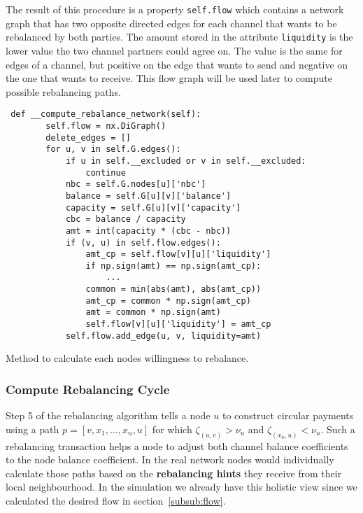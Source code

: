 \documentclass[final]{fhnwreport}       %
\begin{document}
The result of this procedure is a property \texttt{self.flow} which contains a network graph that has two opposite directed edges for each channel that wants to be rebalanced by both parties. The amount stored in the attribute \texttt{liquidity} is the lower value the two channel partners could agree on. The value is the same for edges of a channel, but positive on the edge that wants to send and negative on the one that wants to receive. This flow graph will be used later to compute possible rebalancing paths. 

\begin{listing}[H]
  \begin{verbatim}
 def __compute_rebalance_network(self):
        self.flow = nx.DiGraph()
        delete_edges = []
        for u, v in self.G.edges():
            if u in self.__excluded or v in self.__excluded:
                continue
            nbc = self.G.nodes[u]['nbc']
            balance = self.G[u][v]['balance']
            capacity = self.G[u][v]['capacity']
            cbc = balance / capacity
            amt = int(capacity * (cbc - nbc))
            if (v, u) in self.flow.edges():
                amt_cp = self.flow[v][u]['liquidity']
                if np.sign(amt) == np.sign(amt_cp):
                    ...
                common = min(abs(amt), abs(amt_cp))
                amt_cp = common * np.sign(amt_cp)
                amt = common * np.sign(amt)
                self.flow[v][u]['liquidity'] = amt_cp
            self.flow.add_edge(u, v, liquidity=amt)
  \end{verbatim}
  \caption{Method to calculate each nodes willingness to rebalance.}
  \label{code:comp_flow}
\end{listing}

\subsubsection{Compute Rebalancing Cycle}
Step 5 of the rebalancing algorithm tells a node $u$ to construct circular payments using a path $p = [v,x_1,\dots,x_n,u]$ for which $\zeta_{(u,v)}>\nu_u$ and $\zeta_{(x_n,u)}<\nu_u$. Such a rebalancing transaction helps a node to adjust both channel balance coefficients to the node balance coefficient. In the real network nodes would individually calculate those paths based on the \textbf{rebalancing hints} they receive from their local neighbourhood. In the simulation we already have this holistic view since we calculated the desired flow in section~\ref{subsub:flow}. 
\end{document}
